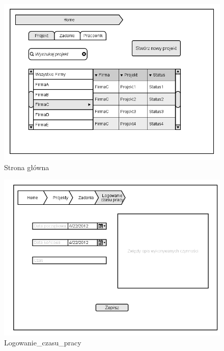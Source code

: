 \begin{figure}[H]
    \centering
    \includegraphics[scale=0.7]{diagramy/intefejsy/Home.png}
    \caption{Strona główna}
    \label{fig:usecase}
\end{figure}


\begin{figure}[H]
    \centering
    \includegraphics[scale=0.7]{diagramy/intefejsy/Logowanie_czasu_pracy.png}
    \caption{Logowanie_czasu_pracy}
    \label{fig:usecase}
\end{figure}

